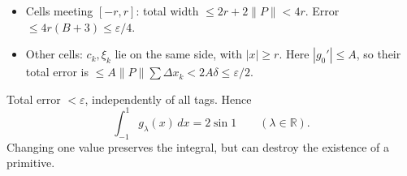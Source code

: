 \documentclass[11pt,letterpaper]{article}
\newcommand{\tightlist}{\setlength{\itemsep}{0pt}\setlength{\parskip}{0pt}}
\begin{document}
\begin{itemize}
\tightlist
\item
  Cells meeting \([-r,r]\): total width \(\le2r+2\|P\|<4r\). Error
  \(\le4r(B+3)\le\varepsilon/4\).
\item
  Other cells: \(c_k,\xi_k\) lie on the same side, with \(|x|\ge r\).
  Here \(|g_0'|\le A\), so their total error is
  \(\le A\|P\|\sum\Delta x_k<2A\delta\le\varepsilon/2\).
\end{itemize}

Total error \(<\varepsilon\), independently of all tags. Hence \[
\int_{-1}^1g_\lambda(x)\,dx=2\sin1\qquad(\lambda\in\mathbb R).
\] Changing one value preserves the integral, but can destroy the
existence of a primitive.
\end{document}
